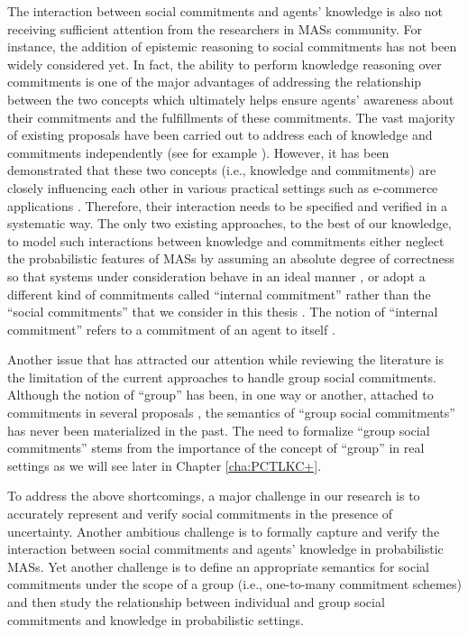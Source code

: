 The interaction between social commitments and agents' knowledge is also not receiving sufficient attention from the researchers in MASs community. For instance, the addition of epistemic reasoning to social commitments has not been widely considered yet. In fact, the ability to perform knowledge reasoning over commitments is one of the major advantages of addressing the relationship between the two concepts which ultimately helps ensure agents' awareness about their commitments and the fulfillments of these commitments. The vast majority of existing proposals have been carried out to address each of knowledge and commitments independently (see for example
\cite{Baldoni2010,Bentahar2012,Delgado2009,El-Menshawy2013a,Giordano2007,Halpern2003,Huang2011,Lomuscio2007,Pham2007,Wan2013}). However, it has been demonstrated that these two concepts (i.e., knowledge and commitments) are closely influencing each other in various practical settings such as e-commerce applications \cite{Al-Saqqar2014a}. Therefore, their interaction needs to be specified and verified in a systematic way. The only two existing approaches, to the best of our knowledge, to model such interactions between knowledge and commitments either neglect the probabilistic features of MASs by assuming an absolute degree of correctness so that systems under consideration behave in an ideal manner \cite{Al-Saqqar2014a}, or adopt a different kind of commitments called ``internal commitment'' rather than the ``social commitments'' that we consider in this thesis \cite{Schmidt2004}. The notion of ``internal commitment'' refers to a commitment of an agent to itself \cite{Singh2008}.

Another issue that has attracted our attention while reviewing the literature is the limitation of the current approaches to handle group social commitments. Although the notion of ``group'' has been, in one way or another, attached to commitments in several proposals \cite{Barbara2010,Sanchez-Anguix2013,Wright2012,YuW2010}, the semantics of ``group social commitments'' has never been materialized in the past. The need to formalize ``group social commitments'' stems from the importance of the concept of ``group'' in real settings as we will see later in Chapter \ref{cha:PCTLKC+}.



To address the above shortcomings, a major challenge in our research is to accurately represent and verify social commitments in the presence of uncertainty. Another ambitious challenge is to formally capture and verify the interaction between social commitments and agents' knowledge in probabilistic MASs. Yet another challenge is to define an appropriate semantics for social commitments under the scope of a group (i.e., one-to-many commitment schemes) and then study the relationship between individual and group social commitments and knowledge in probabilistic settings.


